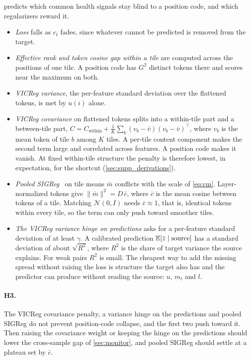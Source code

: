  predicts which common health signals stay blind to a position code, and which regularizers reward it.
\begin{itemize}[leftmargin=*,itemsep=1pt,topsep=2pt]
  \item \emph{Loss} falls as $c_t$ fades, since whatever cannot be predicted is removed from the target.
  \item \emph{Effective rank and token cosine gap within a tile} are computed across the positions of one tile. A position code has $G^2$ distinct tokens there and scores near the maximum on both.
  \item \emph{VICReg variance}, the per-feature standard deviation over the flattened tokens, is met by $u(i)$ alone.
  \item \emph{VICReg covariance} on flattened tokens splits into a within-tile part and a between-tile part, $C = C_{\text{within}} + \frac{1}{K}\sum_b (v_b - \bar v)(v_b - \bar v)^\top$, where $v_b$ is the mean token of tile $b$ among $K$ tiles. A per-tile content component makes the second term large and correlated across features. A position code makes it vanish. At fixed within-tile structure the penalty is therefore lowest, in expectation, for the shortcut (\cref{sec:supp_derivations}).
  \item \emph{Pooled SIGReg}~\cite{balestriero2025lejepa} on tile means $\bar m$ conflicts with the scale of \cref{eq:cm}. Layer-normalized tokens give $\|\bar m\|^2 = D\,\bar c$, where $\bar c$ is the mean cosine between tokens of a tile. Matching $\mathcal{N}(0, I)$ needs $\bar c \approx 1$, that is, identical tokens within every tile, so the term can only push toward smoother tiles.
  \item \emph{The VICReg variance hinge on predictions} asks for a per-feature standard deviation of at least $\gamma$. A calibrated prediction $\operatorname*{\mathbb{E}}[\bar z \mid \text{source}]$ has a standard deviation of about $\sqrt{R^2}$, where $R^2$ is the share of target variance the source explains. For weak pairs $R^2$ is small. The cheapest way to add the missing spread without raising the loss is structure the target also has and the predictor can produce without reading the source: $u$, $m_t$ and $l$.
\end{itemize}

\paragraph{H3.} The VICReg covariance penalty, a variance hinge on the predictions and pooled SIGReg do not prevent position-code collapse, and the first two push toward it. Then raising the covariance weight or keeping the hinge on the predictions should lower the cross-sample gap of \cref{sec:monitor}, and pooled SIGReg should settle at a plateau set by $\bar c$.

